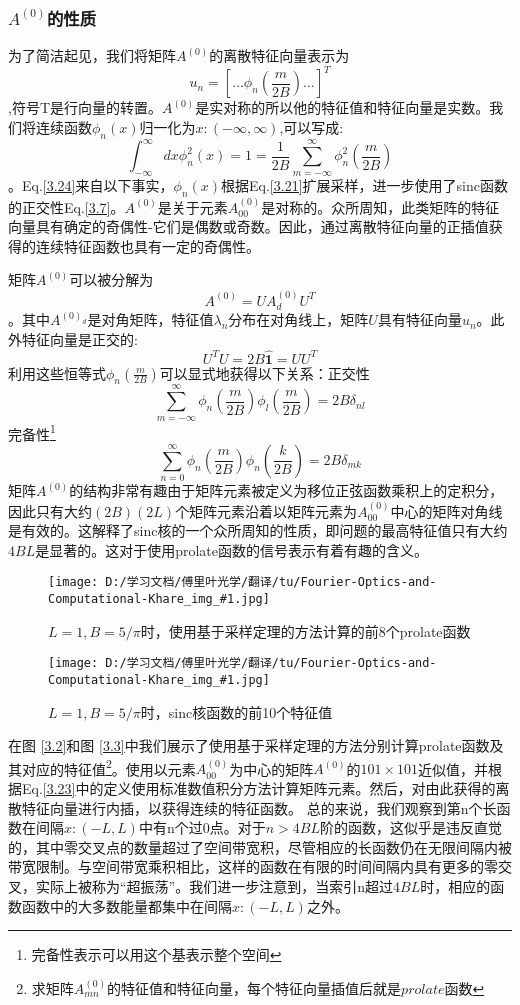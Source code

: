 \documentclass[10pt, UTF8]{ctexart}%
\newcommand {\InsertPic}[3]{\begin{figure}[htbp] \label{#2}\centering \texttt{[image: D:/学习文档/傅里叶光学/翻译/tu/Fourier-Optics-and-Computational-Khare\_img\_\#1.jpg]}\caption{#3} \end{figure}}%
\newcommand{\InsertEqution}[2]{\begin{equation}
  \label{#1}
   #2
 \end{equation}}
\newcommand{\RefEq}[1]{Eq.\ref{#1}}
\newcommand{\InsertInlineEq}[1]{$#1$}
\newcommand{\RefFig}[1]{图 \ref{#1}}
\begin{document}
\begin{sloppypar}
\subsubsection{\InsertInlineEq{A^{(0)}}的性质}
为了简洁起见，我们将矩阵\InsertInlineEq{A^{(0)}}的离散特征向量表示为
\InsertEqution{?1}{u_{n}=\left[\ldots \phi_{n}\left(\frac{m}{2 B}\right) \ldots\right]^{T}},符号T是行向量的转置。\InsertInlineEq{A^{(0)}}是实对称的所以他的特征值和特征向量是实数。我们将连续函数\InsertInlineEq{\phi_n(x)}归一化为\InsertInlineEq{x:(-\infty,\infty)},可以写成:\InsertEqution{3.24}{\int_{-\infty}^{\infty} d x \phi_{n}^{2}(x)=1 = \frac{1}{2 B} \sum_{m=-\infty}^{\infty} \phi_{n}^{2}\left(\frac{m}{2 B}\right)}。\RefEq{3.24}来自以下事实，\InsertInlineEq{\phi_n(x)}根据\RefEq{3.21}扩展采样，进一步使用了sinc函数的正交性\RefEq{3.7}。\InsertInlineEq{A^{(0)}}是关于元素\InsertInlineEq{A^{(0)}_{00}}是对称的。众所周知，此类矩阵的特征向量具有确定的奇偶性-它们是偶数或奇数。因此，通过离散特征向量的正插值获得的连续特征函数也具有一定的奇偶性。

矩阵\InsertInlineEq{A^{(0)}}可以被分解为\InsertEqution{3.25}{A^{(0)}=U A_{d}^{(0)} U^{T}}。其中\InsertInlineEq{A^{(0)_d}}是对角矩阵，特征值\InsertInlineEq{\lambda_n}分布在对角线上，矩阵\InsertInlineEq{U}具有特征向量\InsertInlineEq{u_n}。此外特征向量是正交的:\InsertEqution{3.26}{U^{T} U=2 B \hat{\mathbf{1}}=U U^{T}}利用这些恒等式\InsertInlineEq{\phi_n(\frac{m}{2B})}可以显式地获得以下关系：正交性\InsertEqution{3.27}{\sum_{m=-\infty}^{\infty} \phi_{n}\left(\frac{m}{2 B}\right) \phi_{l}\left(\frac{m}{2 B}\right)=2 B \delta_{n l}}完备性\footnote[1]{完备性表示可以用这个基表示整个空间}\InsertEqution{3.28}{\sum_{n=0}^{\infty} \phi_{n}\left(\frac{m}{2 B}\right) \phi_{n}\left(\frac{k}{2 B}\right)=2 B \delta_{m k}}
矩阵\InsertInlineEq{A^{(0)}}的结构非常有趣由于矩阵元素被定义为移位正弦函数乘积上的定积分，因此只有大约\InsertInlineEq{(2B)(2L)}个矩阵元素沿着以矩阵元素为\InsertInlineEq{A^{(0)}_{00}}中心的矩阵对角线是有效的。这解释了sinc核的一个众所周知的性质，即问题的最高特征值只有大约\InsertInlineEq{4BL}是显著的。这对于使用prolate函数的信号表示有着有趣的含义。\InsertPic{14}{F3.2}{\InsertInlineEq{L=1,B=5/\pi}时，使用基于采样定理的方法计算的前8个prolate函数}\InsertPic{15}{F3.3}{\InsertInlineEq{L=1,B=5/\pi}时，sinc核函数的前10个特征值}
在\RefFig{3.2}和\RefFig{3.3}中我们展示了使用基于采样定理的方法分别计算prolate函数及其对应的特征值\footnote{求矩阵\InsertInlineEq{A_{mn}^{(0)}的特征值和特征向量，每个特征向量插值后就是prolate函数}}。使用以元素\InsertInlineEq{A^{(0)}_{00}}为中心的矩阵\InsertInlineEq{A^{(0)}}的\InsertInlineEq{101\times101}近似值，并根据\RefEq{3.23}中的定义使用标准数值积分方法计算矩阵元素。然后，对由此获得的离散特征向量进行内插，以获得连续的特征函数。 总的来说，我们观察到第n个长函数在间隔\InsertInlineEq{x:(-L,L)}中有n个过0点。对于\InsertInlineEq{n>4BL}阶的函数，这似乎是违反直觉的，其中零交叉点的数量超过了空间带宽积，尽管相应的长函数仍在无限间隔内被带宽限制。与空间带宽乘积相比，这样的函数在有限的时间间隔内具有更多的零交叉，实际上被称为“超振荡”。我们进一步注意到，当索引n超过\InsertInlineEq{4BL}时，相应的函数函数中的大多数能量都集中在间隔\InsertInlineEq{x:(-L,L)}之外。


\end{sloppypar}
\end{document}
